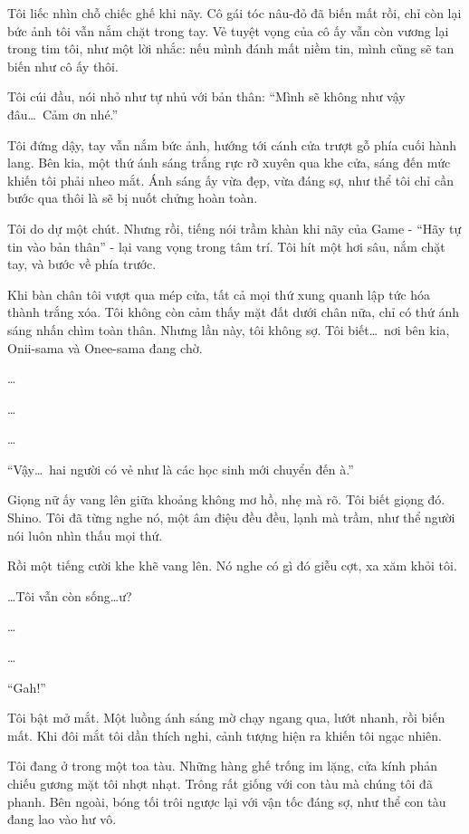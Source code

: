 \documentclass[../main.tex]{subfiles}
\begin{document}
Tôi liếc nhìn chỗ chiếc ghế khi nãy. Cô gái tóc nâu-đỏ đã biến mất rồi, chỉ còn lại bức ảnh tôi vẫn nắm chặt trong tay. Vẻ tuyệt vọng của cô ấy vẫn còn vương lại trong tim tôi, như một lời nhắc: nếu mình đánh mất niềm tin, mình cũng sẽ tan biến như cô ấy thôi.

Tôi cúi đầu, nói nhỏ như tự nhủ với bản thân: ``Mình sẽ không như vậy đâu\dots\ Cảm ơn nhé.''

Tôi đứng dậy, tay vẫn nắm bức ảnh, hướng tới cánh cửa trượt gỗ phía cuối hành lang. Bên kia, một thứ ánh sáng trắng rực rỡ xuyên qua khe cửa, sáng đến mức khiến tôi phải nheo mắt. Ánh sáng ấy vừa đẹp, vừa đáng sợ, như thể tôi chỉ cần bước qua thôi là sẽ bị nuốt chửng hoàn toàn.

Tôi do dự một chút. Nhưng rồi, tiếng nói trầm khàn khi nãy của Game - ``Hãy tự tin vào bản thân'' - lại vang vọng trong tâm trí.
Tôi hít một hơi sâu, nắm chặt tay, và bước về phía trước.

Khi bàn chân tôi vượt qua mép cửa, tất cả mọi thứ xung quanh lập tức hóa thành trắng xóa. Tôi không còn cảm thấy mặt đất dưới chân nữa, chỉ có thứ ánh sáng nhấn chìm toàn thân. Nhưng lần này, tôi không sợ. Tôi biết\dots\ nơi bên kia, Onii-sama và Onee-sama đang chờ.

\dots

\dots


\dots

``Vậy\dots\ hai người có vẻ như là các học sinh mới chuyển đến à.''

Giọng nữ ấy vang lên giữa khoảng không mơ hồ, nhẹ mà rõ. Tôi biết giọng đó. Shino. Tôi đã từng nghe nó, một âm điệu đều đều, lạnh mà trầm, như thể người nói luôn nhìn thấu mọi thứ.

Rồi một tiếng cười khe khẽ vang lên. Nó nghe có gì đó giễu cợt, xa xăm khỏi tôi.

\dots Tôi vẫn còn sống\dots ư?

\dots

\dots

``Gah!''

Tôi bật mở mắt. Một luồng ánh sáng mờ chạy ngang qua, lướt nhanh, rồi biến mất. Khi đôi mắt tôi dần thích nghi, cảnh tượng hiện ra khiến tôi ngạc nhiên.

Tôi đang ở trong một toa tàu. Những hàng ghế trống im lặng, cửa kính phản chiếu gương mặt tôi nhợt nhạt. Trông rất giống với con tàu mà chúng tôi đã phanh. Bên ngoài, bóng tối trôi ngược lại với vận tốc đáng sợ, như thể con tàu đang lao vào hư vô.
\end{document}
